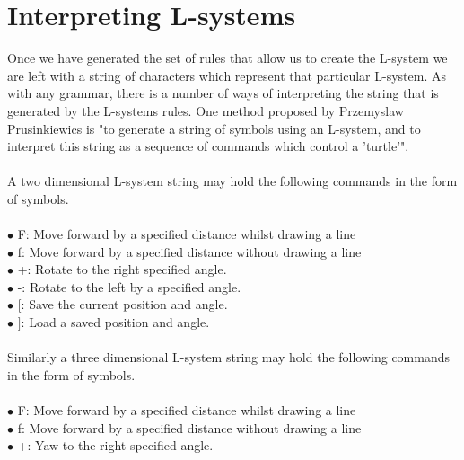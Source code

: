 \section{Interpreting L-systems} \label{interpreting l-systems}

Once we have generated the set of rules that allow us to create the L-system we are left with a string of characters which represent that particular L-system. As with any grammar, there is a number of ways of interpreting the string that is generated by the L-systems rules. One method proposed by Przemyslaw Prusinkiewics is "to generate a string of symbols using an L-system, and to interpret this string as a sequence of commands which control a 'turtle'". \cite{prusinkiewicz1986graphical}
\\
\\
A two dimensional L-system string may hold the following commands in the form of symbols. \\
\\
$\bullet$ F: 				\hspace{10mm} 		Move forward by a specified distance whilst drawing a line \\
$\bullet$ f: 				\hspace{10mm} 		Move forward by a specified distance without drawing a line \\
$\bullet$ +: 				\hspace{10mm} 		Rotate to the right specified angle. \\
$\bullet$ -: 				\hspace{10mm} 		Rotate to the left by a specified angle.  \\
$\bullet$ $[$: 				\hspace{10mm} 		Save the current position and angle. \\
$\bullet$ $]$: 				\hspace{10mm} 		Load a saved position and angle. \\
\\
Similarly a three dimensional L-system string may hold the following commands in the form of symbols. \\
\\ 
$\bullet$ F: 				\hspace{10mm}  		Move forward by a specified distance whilst drawing a line \\
$\bullet$ f: 				\hspace{10mm} 		Move forward by a specified distance without drawing a line \\
$\bullet$ +: 				\hspace{10mm} 		Yaw to the right specified angle. \\
